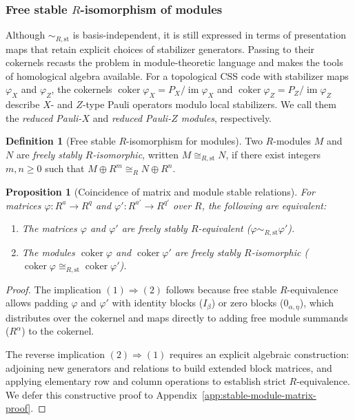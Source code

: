 \documentclass[aps,prx,english,superscriptaddress,twocolumn,tightenlines,showpacs,longbibliography,floatfix,amsfonts]{revtex4-2}
\newtheorem{proposition}{Proposition}
\theoremstyle{remark}
\theoremstyle{definition}
\newtheorem{definition}{Definition}
\begin{document}
\subsubsection{Free stable \(R\)-isomorphism of modules}

Although \(\sim_{R,\mathrm{st}}\) is basis-independent,
it is still expressed in terms of presentation maps that retain explicit choices of stabilizer generators.  Passing to their
cokernels recasts the problem in module-theoretic language and makes the
tools of homological algebra available.  For a topological CSS code with
stabilizer maps $\varphi_X$ and $\varphi_Z$, the cokernels
$\operatorname{coker}\varphi_X=P_X/\operatorname{im}\varphi_X$ and
$\operatorname{coker}\varphi_Z=P_Z/\operatorname{im}\varphi_Z$ describe
$X$- and $Z$-type Pauli operators modulo local stabilizers.  We call them the
\emph{reduced Pauli-$X$} and \emph{reduced Pauli-$Z$ modules}, respectively.



\begin{definition}[Free stable \(R\)-isomorphism for modules]
	Two $R$-modules $M$ and $N$ are \emph{freely stably \(R\)-isomorphic}, written $M \cong_{R,\mathrm{st}} N$, if there exist integers $m,n \ge 0$ such that $M \oplus R^m \cong_R N \oplus R^n$.
\end{definition}

\begin{proposition}[Coincidence of matrix and module stable relations]
	\label{prop:stable-module-matrix}
	For matrices $\varphi \colon R^a \to R^q$ and $\varphi' \colon R^{a'} \to R^{q'}$ over $R$, the following are equivalent:
	\begin{enumerate}
			\item The matrices $\varphi$ and $\varphi'$ are freely stably \(R\)-equivalent ($\varphi \sim_{R,\mathrm{st}} \varphi'$).
		\item The modules $\operatorname{coker}\varphi$ and $\operatorname{coker}\varphi'$ are freely stably \(R\)-isomorphic ($\operatorname{coker}\varphi \cong_{R,\mathrm{st}} \operatorname{coker}\varphi'$).
	\end{enumerate}
\end{proposition}

\begin{proof}
	The implication $(1) \Rightarrow (2)$ follows because free stable \(R\)-equivalence allows padding $\varphi$ and $\varphi'$ with identity blocks ($I_\beta$) or zero blocks ($0_{\alpha, \eta}$), which distributes over the cokernel and maps directly to adding free module summands ($R^\alpha$) to the cokernel.

	The reverse implication $(2) \Rightarrow (1)$ requires an explicit algebraic construction: adjoining new generators and relations to build extended block matrices, and applying elementary row and column operations to establish strict \(R\)-equivalence. We defer this constructive proof to Appendix~\ref{app:stable-module-matrix-proof}.
\end{proof}
\end{document}
